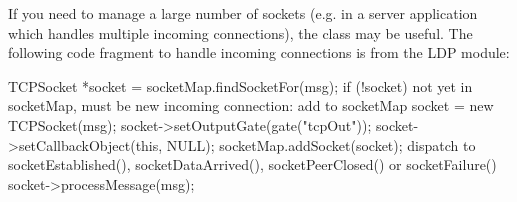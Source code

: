 If you need to manage a large number of sockets (e.g. in a server
application which handles multiple incoming connections), the
 class may be useful. The following code
fragment to handle incoming connections is from the LDP module:

\begin{cpp}
TCPSocket *socket = socketMap.findSocketFor(msg);
if (!socket)
{
    not yet in socketMap, must be new incoming connection: add to socketMap
    socket = new TCPSocket(msg);
    socket->setOutputGate(gate("tcpOut"));
    socket->setCallbackObject(this, NULL);
    socketMap.addSocket(socket);
}
dispatch to socketEstablished(), socketDataArrived(), socketPeerClosed()
or socketFailure()
socket->processMessage(msg);
\end{cpp}


